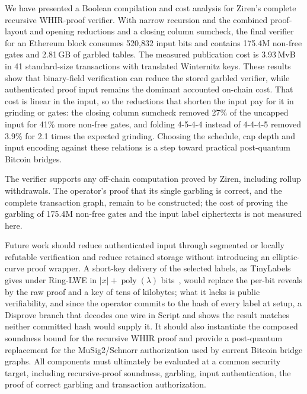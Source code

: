 \documentclass[11pt]{article}
\begin{document}
We have presented a Boolean compilation and cost analysis for Ziren's
complete recursive WHIR-proof verifier. With narrow recursion and the combined
proof-layout and opening reductions and a closing column sumcheck, the final
verifier for an Ethereum block consumes 520{,}832
input bits and contains 175.4M non-free gates and
2.81\,GB of garbled tables.
The measured
publication cost is 3.93\,MvB in 41 standard-size transactions with
translated Winternitz keys. These results
show that binary-field verification can reduce the stored garbled verifier,
while authenticated proof input remains the dominant accounted on-chain cost.
That cost is linear in the input, so the reductions that shorten the input
pay for it in grinding or gates: the closing column sumcheck removed 27\% of
the uncapped input for 41\% more non-free gates, and folding 4-5-4-4 instead
of 4-4-4-5 removed 3.9\% for 2.1 times the expected grinding. Choosing the schedule, cap depth
and input encoding against these relations is a step toward practical
post-quantum Bitcoin bridges.

The verifier supports any off-chain computation proved by Ziren, including
rollup withdrawals. The operator's proof that its single garbling is
correct, and the complete transaction graph, remain to be constructed; the
cost of proving the garbling of 175.4M non-free gates and the input label
ciphertexts is not measured here.

Future work should reduce authenticated input through segmented or locally
refutable verification and reduce
retained storage without introducing an elliptic-curve proof wrapper. A short-key delivery of the selected labels,
as TinyLabels gives under Ring-LWE in $|x|+\operatorname{poly}(\lambda)$
bits~\cite{tinylabels24}, would replace the per-bit reveals by the raw
proof and a key of tens of kilobytes; what it lacks is public
verifiability, and since the operator commits to the hash of every label at
setup, a Disprove branch that decodes one wire in Script and shows the
result matches neither committed hash would supply it. It should also instantiate the composed
soundness bound for the recursive WHIR proof and provide a post-quantum
replacement for the MuSig2/Schnorr authorization used by current Bitcoin
bridge graphs. All components must ultimately be evaluated at a common security
target, including recursive-proof soundness, garbling, input authentication,
the proof of correct garbling and transaction authorization.


{\raggedright}
\end{document}

